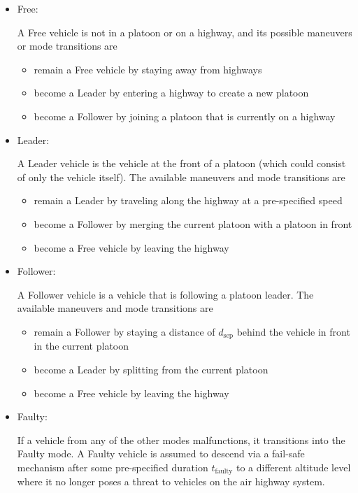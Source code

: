 \begin{itemize}
\item Free: 

A Free vehicle is not in a platoon or on a highway, and its possible maneuvers or mode transitions are
\begin{itemize}
\item remain a Free vehicle by staying away from highways
\item become a Leader by entering a highway to create a new platoon
\item become a Follower by joining a platoon that is currently on a highway
\end{itemize} 

\item Leader: 

A Leader vehicle is the vehicle at the front of a platoon (which could consist of only the vehicle itself). The available maneuvers and mode transitions are

\begin{itemize}
\item remain a Leader by traveling along the highway at a pre-specified speed
\item become a Follower by merging the current platoon with a platoon in front
\item become a Free vehicle by leaving the highway
\end{itemize}

\item Follower: 

A Follower vehicle is a vehicle that is following a platoon leader. The available maneuvers and mode transitions are 

\begin{itemize}
\item remain a Follower by staying a distance of $d_\text{sep}$ behind the vehicle in front in the current platoon
\item become a Leader by splitting from the current platoon
\item become a Free vehicle by leaving the highway
\end{itemize}

\item Faulty: 

If a vehicle from any of the other modes malfunctions, it transitions into the Faulty mode. A Faulty vehicle is assumed to descend via a fail-safe mechanism after some pre-specified duration $t_\text{faulty}$ to a different altitude level where it no longer poses a threat to vehicles on the air highway system.
\end{itemize}

